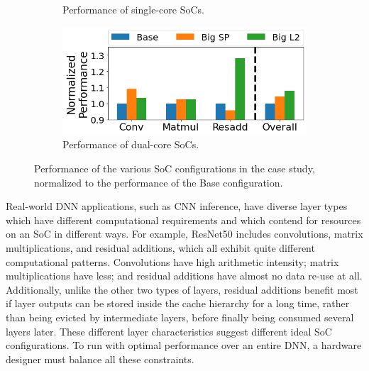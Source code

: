 \begin{figure}[t]
\begin{subfigure}[b]{.325\textwidth}
      \caption{Performance of single-core SoCs.}
      \label{fig:single-contention}
\end{subfigure}
\hfill
\begin{subfigure}[b]{.325\textwidth}
    \vspace{0pt}
      \centering
      \includegraphics[width=\linewidth]{fig/dual-core-contention.png}
      \caption{Performance of dual-core SoCs.}
      \label{fig:dual-contention}
\end{subfigure}
    \caption{Performance of the various SoC configurations in the case study, normalized to the performance of the Base configuration.}
    \label{fig:contention}
    \vspace{-0.2in}
\end{figure}

Real-world DNN applications, such as CNN inference, have diverse layer types which have different computational requirements and which contend for resources on an SoC in different ways. For example, ResNet50 includes convolutions, matrix multiplications, and residual additions, which all exhibit quite different computational patterns. Convolutions have high arithmetic intensity; matrix multiplications have less; and residual additions have almost no data re-use at all. Additionally, unlike the other two types of layers, residual additions benefit most if layer outputs can be stored inside the cache hierarchy for a long time, rather than being evicted by intermediate layers, before finally being consumed several layers later. These different layer characteristics suggest different ideal SoC configurations. To run with optimal performance over an entire DNN, a hardware designer must balance all these constraints.

